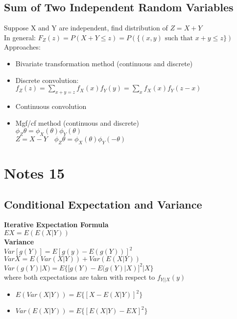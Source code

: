 \documentclass{article}
\begin{document}
\begin{flushleft}
\subsection*{Sum of Two Independent Random Variables}
Suppose X and Y are independent, find distribution of $Z=X+Y$\\
In general: $F_Z(z)=P(X+Y\leq z)=P(\{(x,y) \text{ such that } x+y\leq z\})$\\
Approaches:
\begin{itemize}
\item Bivariate transformation method (continuous and discrete)\\
\item Discrete convolution:\\
$f_Z(z)=\sum_{x+y=z}f_X(x)f_Y(y)=\sum_{x}f_X(x)f_Y(z-x)$\\
\item Continuous convolution\\
\item Mgf/cf method (continuous and discrete)\\
$\phi_Z{\theta}=\phi_X(\theta)\phi_Y(\theta)$\\
$Z=X-Y \quad \phi_Z{\theta}=\phi_X(\theta)\phi_Y(-\theta)$
\end{itemize}
\section*{Notes 15}
\subsection*{Conditional Expectation and Variance}
\textbf{Iterative Expectation Formula}\\
$EX=E(E(X|Y))$\\
\textbf{Variance}\\
$Var[g(Y)]=E[g(y)-E(g(Y))]^2$\medbreak
$VarX=E(Var(X|Y))+Var(E(X|Y))$\\
$Var(g(Y)|X)=E\{[g(Y)-E(g(Y)|X)]^2|X\}$\\
where both expectations are taken with respect to $f_{Y||X}(y)$\\
\begin{itemize}
\item $E(Var(X|Y))=E\{[X-E(X|Y)]^2\}$\\
\item $Var(E(X|Y))=E\{[E(X|Y)-EX]^2\}$\\
\end{itemize}

\end{flushleft}
\end{document}
